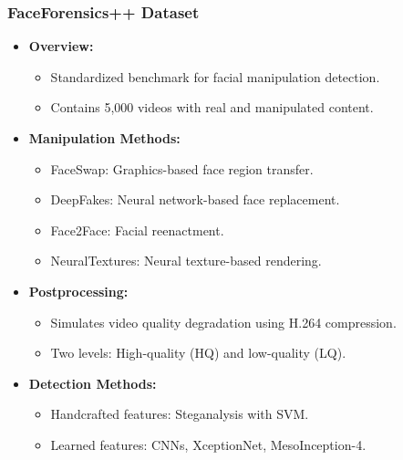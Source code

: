\documentclass{beamer}
\begin{document}
\begin{frame}
    \frametitle{FaceForensics++ Dataset}
    \begin{itemize}
        \item \textbf{Overview:}
            \begin{itemize}
                \item Standardized benchmark for facial manipulation detection.
                \item Contains 5,000 videos with real and manipulated content.
            \end{itemize}
        \item \textbf{Manipulation Methods:}
            \begin{itemize}
                \item FaceSwap: Graphics-based face region transfer.
                \item DeepFakes: Neural network-based face replacement.
                \item Face2Face: Facial reenactment.
                \item NeuralTextures: Neural texture-based rendering.
            \end{itemize}
        \item \textbf{Postprocessing:}
            \begin{itemize}
                \item Simulates video quality degradation using H.264 compression.
                \item Two levels: High-quality (HQ) and low-quality (LQ).
            \end{itemize}
        \item \textbf{Detection Methods:}
            \begin{itemize}
                \item Handcrafted features: Steganalysis with SVM.
                \item Learned features: CNNs, XceptionNet, MesoInception-4.
            \end{itemize}
    \end{itemize}
\end{frame}
\end{document}
